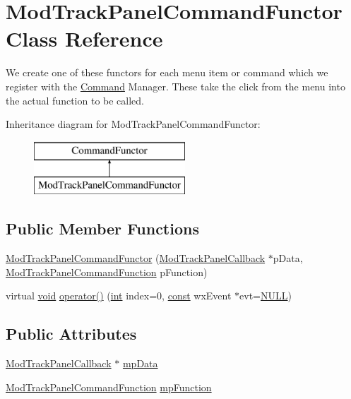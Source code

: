 \hypertarget{class_mod_track_panel_command_functor}{}\section{Mod\+Track\+Panel\+Command\+Functor Class Reference}
\label{class_mod_track_panel_command_functor}


We create one of these functors for each menu item or command which we register with the \hyperlink{class_command}{Command} Manager. These take the click from the menu into the actual function to be called.  


Inheritance diagram for Mod\+Track\+Panel\+Command\+Functor\+:\begin{figure}[H]
\begin{center}
\leavevmode
\includegraphics[height=2.000000cm]{class_mod_track_panel_command_functor}
\end{center}
\end{figure}
\subsection*{Public Member Functions}
\begin{DoxyCompactItemize}
\item 
\hyperlink{class_mod_track_panel_command_functor_a88a741f45babd666bb3738835cef1f09}{Mod\+Track\+Panel\+Command\+Functor} (\hyperlink{class_mod_track_panel_callback}{Mod\+Track\+Panel\+Callback} $\ast$p\+Data, \hyperlink{_mod_track_panel_callback_8cpp_a8917fb1777ec794f8133ea97e7ed8c3e}{Mod\+Track\+Panel\+Command\+Function} p\+Function)
\item 
virtual \hyperlink{sound_8c_ae35f5844602719cf66324f4de2a658b3}{void} \hyperlink{class_mod_track_panel_command_functor_acba385d0dc780f919f1fb0e1f8eb4c34}{operator()} (\hyperlink{xmltok_8h_a5a0d4a5641ce434f1d23533f2b2e6653}{int} index=0, \hyperlink{getopt1_8c_a2c212835823e3c54a8ab6d95c652660e}{const} wx\+Event $\ast$evt=\hyperlink{px__mixer_8h_a070d2ce7b6bb7e5c05602aa8c308d0c4}{N\+U\+LL})
\end{DoxyCompactItemize}
\subsection*{Public Attributes}
\begin{DoxyCompactItemize}
\item 
\hyperlink{class_mod_track_panel_callback}{Mod\+Track\+Panel\+Callback} $\ast$ \hyperlink{class_mod_track_panel_command_functor_a524151f2a8a7249d41d2fd53e6c6e5c4}{mp\+Data}
\item 
\hyperlink{_mod_track_panel_callback_8cpp_a8917fb1777ec794f8133ea97e7ed8c3e}{Mod\+Track\+Panel\+Command\+Function} \hyperlink{class_mod_track_panel_command_functor_ac8393c96b91a462ea07e3098dc491088}{mp\+Function}
\end{DoxyCompactItemize}


